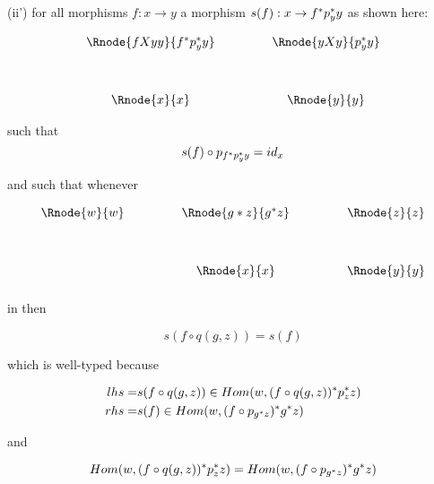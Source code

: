 \documentclass[10pt,a4paper]{article}
\begin{document}
\noindent (ii') for all morphisms $f: x \rightarrow y$ a morphism $s(f) : x \rightarrow f ^* p_y ^* y$ as shown here:

\begin{center}
\begin{displaymath}
\begin{array}{cp{.9cm}c}
\Rnode{fXyy}{f\sub p_y \sub y} & & \Rnode{yXy}{p_y \sub y}\\ [1.2cm]
\Rnode{x}{x}         & & \Rnode{y}{y}
\end{array}
\end{displaymath}
\end{center}

such that 
\begin{equation}
s(f) \circ p_{f^* p_y ^* y}=id_x
\end{equation}

and such that whenever

\begin{center}
\begin{displaymath}
\begin{array}{c p{.9cm} c p{.9cm} c}
\Rnode{w}{w}&& \Rnode{g*z}{g \sub z} && \Rnode{z}{z} \\ [1.2cm]
            && \Rnode{x}{x}  && \Rnode{y}{y} \\ [0.2cm]
\end{array}
\end{displaymath}
\end{center}

in  then

\begin{equation}
s(f \circ q(g,z))=s(f)
\end{equation}

which is well-typed because


\begin{align*}
      lhs = &s(f \circ q(g,z)) \in Hom(w,(f \circ q(g,z) ) ^* p_z ^* z ) \\
      rhs = &s(f) \in Hom(w,(f \circ   p_{g ^* z} ) ^*  g ^* z  )\\
\end{align*}

and

\begin{equation*}
     Hom(w,(f \circ q(g,z) ) ^* p_z ^* z ) = Hom(w,(f \circ   p_{g ^* z} ) ^*  g ^* z )
\end{equation*}
\end{document}
